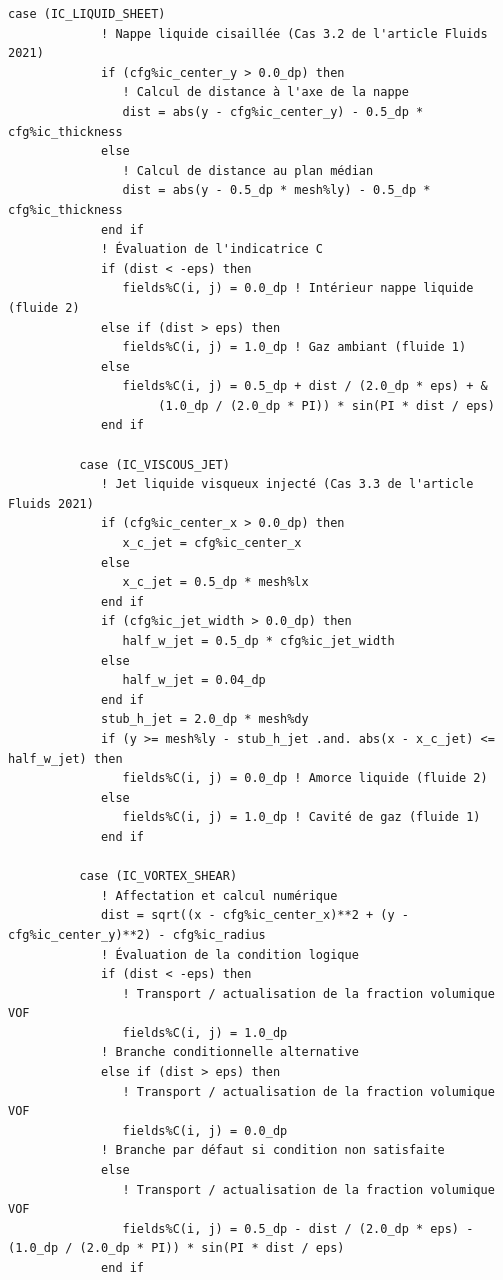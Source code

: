 \documentclass[10pt,a4paper,oneside]{book}
\begin{document}
\begin{lstlisting}[language={[95]Fortran}]
          case (IC_LIQUID_SHEET)
             ! Nappe liquide cisaillée (Cas 3.2 de l'article Fluids 2021)
             if (cfg%ic_center_y > 0.0_dp) then
                ! Calcul de distance à l'axe de la nappe
                dist = abs(y - cfg%ic_center_y) - 0.5_dp * cfg%ic_thickness
             else
                ! Calcul de distance au plan médian
                dist = abs(y - 0.5_dp * mesh%ly) - 0.5_dp * cfg%ic_thickness
             end if
             ! Évaluation de l'indicatrice C
             if (dist < -eps) then
                fields%C(i, j) = 0.0_dp ! Intérieur nappe liquide (fluide 2)
             else if (dist > eps) then
                fields%C(i, j) = 1.0_dp ! Gaz ambiant (fluide 1)
             else
                fields%C(i, j) = 0.5_dp + dist / (2.0_dp * eps) + &
                     (1.0_dp / (2.0_dp * PI)) * sin(PI * dist / eps)
             end if

          case (IC_VISCOUS_JET)
             ! Jet liquide visqueux injecté (Cas 3.3 de l'article Fluids 2021)
             if (cfg%ic_center_x > 0.0_dp) then
                x_c_jet = cfg%ic_center_x
             else
                x_c_jet = 0.5_dp * mesh%lx
             end if
             if (cfg%ic_jet_width > 0.0_dp) then
                half_w_jet = 0.5_dp * cfg%ic_jet_width
             else
                half_w_jet = 0.04_dp
             end if
             stub_h_jet = 2.0_dp * mesh%dy
             if (y >= mesh%ly - stub_h_jet .and. abs(x - x_c_jet) <= half_w_jet) then
                fields%C(i, j) = 0.0_dp ! Amorce liquide (fluide 2)
             else
                fields%C(i, j) = 1.0_dp ! Cavité de gaz (fluide 1)
             end if

          case (IC_VORTEX_SHEAR)
             ! Affectation et calcul numérique
             dist = sqrt((x - cfg%ic_center_x)**2 + (y - cfg%ic_center_y)**2) - cfg%ic_radius
             ! Évaluation de la condition logique
             if (dist < -eps) then
                ! Transport / actualisation de la fraction volumique VOF
                fields%C(i, j) = 1.0_dp
             ! Branche conditionnelle alternative
             else if (dist > eps) then
                ! Transport / actualisation de la fraction volumique VOF
                fields%C(i, j) = 0.0_dp
             ! Branche par défaut si condition non satisfaite
             else
                ! Transport / actualisation de la fraction volumique VOF
                fields%C(i, j) = 0.5_dp - dist / (2.0_dp * eps) - (1.0_dp / (2.0_dp * PI)) * sin(PI * dist / eps)
             end if


\end{lstlisting}
\end{document}
